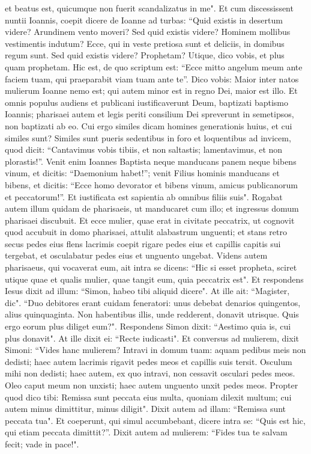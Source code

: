 \begin{biblechapter}
\verse et beatus est, quicumque non fuerit scandalizatus in me". 
\verse Et cum discessissent nuntii Ioannis, coepit dicere de Ioanne ad turbas: “Quid existis in desertum videre? Arundinem vento moveri? 
\verse Sed quid existis videre? Hominem mollibus vestimentis indutum? Ecce, qui in veste pretiosa sunt et deliciis, in domibus regum sunt. 
\verse Sed quid existis videre? Prophetam? Utique, dico vobis, et plus quam prophetam. 
\verse Hic est, de quo scriptum est: “Ecce mitto angelum meum ante faciem tuam, qui praeparabit viam tuam ante te”. 
\verse Dico vobis: Maior inter natos mulierum Ioanne nemo est; qui autem minor est in regno Dei, maior est illo. 
\verse Et omnis populus audiens et publicani iustificaverunt Deum, baptizati baptismo Ioannis; 
\verse pharisaei autem et legis periti consilium Dei spreverunt in semetipsos, non baptizati ab eo. 
\verse Cui ergo similes dicam homines generationis huius, et cui similes sunt?  
\verse Similes sunt pueris sedentibus in foro et loquentibus ad invicem, quod dicit: “Cantavimus vobis tibiis, et non saltastis; lamentavimus, et non plorastis!”. 
\verse Venit enim Ioannes Baptista neque manducans panem neque bibens vinum, et dicitis: “Daemonium habet!”; 
\verse venit Filius hominis manducans et bibens, et dicitis: “Ecce homo devorator et bibens vinum, amicus publicanorum et peccatorum!”. 
\verse Et iustificata est sapientia ab omnibus filiis suis". 
\verse Rogabat autem illum quidam de pharisaeis, ut manducaret cum illo; et ingressus domum pharisaei discubuit. 
\verse Et ecce mulier, quae erat in civitate peccatrix, ut cognovit quod accubuit in domo pharisaei, attulit alabastrum unguenti; 
\verse et stans retro secus pedes eius flens lacrimis coepit rigare pedes eius et capillis capitis sui tergebat, et osculabatur pedes eius et unguento ungebat. 
\verse Videns autem pharisaeus, qui vocaverat eum, ait intra se dicens: “Hic si esset propheta, sciret utique quae et qualis mulier, quae tangit eum, quia peccatrix est". 
\verse Et respondens Iesus dixit ad illum: “Simon, habeo tibi aliquid dicere". At ille ait: “Magister, dic". 
\verse “Duo debitores erant cuidam feneratori: unus debebat denarios quingentos, alius quinquaginta. 
\verse Non habentibus illis, unde redderent, donavit utrisque. Quis ergo eorum plus diliget eum?". 
\verse Respondens Simon dixit: “Aestimo quia is, cui plus donavit". At ille dixit ei: “Recte iudicasti". 
\verse Et conversus ad mulierem, dixit Simoni: “Vides hanc mulierem? Intravi in domum tuam: aquam pedibus meis non dedisti; haec autem lacrimis rigavit pedes meos et capillis suis tersit. 
\verse Osculum mihi non dedisti; haec autem, ex quo intravi, non cessavit osculari pedes meos. 
\verse Oleo caput meum non unxisti; haec autem unguento unxit pedes meos. 
\verse Propter quod dico tibi: Remissa sunt peccata eius multa, quoniam dilexit multum; cui autem minus dimittitur, minus diligit".  
\verse Dixit autem ad illam: “Remissa sunt peccata tua". 
\verse Et coeperunt, qui simul accumbebant, dicere intra se: “Quis est hic, qui etiam peccata dimittit?”. 
\verse Dixit autem ad mulierem: “Fides tua te salvam fecit; vade in pace!". 
\end{biblechapter}

